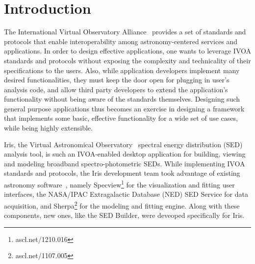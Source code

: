 \documentclass[5p]{elsarticle}
\begin{document}
\section{Introduction}
The International Virtual Observatory Alliance~\citep[IVOA;][]{2004SPIE.5493..137Q} provides a set of standards and protocols that enable interoperability among astronomy-centered services and applications. In order to design effective applications, one wants to leverage IVOA standards and protocols without exposing the complexity and technicality of their specifications to the users. Also, while application developers implement many desired functionalities, they must keep the door open for plugging in user's analysis code, and allow third party developers to extend the application's functionality without being aware of the standards themselves. Designing such general purpose applications thus becomes an exercise in designing a framework that implements some basic, effective functionality for a wide set of use cases, while being highly extensible.


Iris, the Virtual Astronomical Observatory~\citep[VAO;][]{2012SPIE.8449E..0HB} spectral energy distribution (SED) analysis tool, is such an IVOA-enabled desktop application for building, viewing and modeling broadband spectro-photometric SEDs. While implementing IVOA standards and protocols, the Iris development team took advantage of existing astronomy software~\citep{2012ASPC..461..893D,2013AAS...22124038L}, namely Specview\footnote{ascl.net/1210.016} for the visualization and fitting user interfaces, the NASA/IPAC Extragalactic Database (NED) SED Service for data acquisition, and Sherpa\footnote{ascl.net/1107.005} for the modeling and fitting engine. Along with these components, new ones, like the SED Builder, were deveoped specifically for Iris. 

\end{document}
